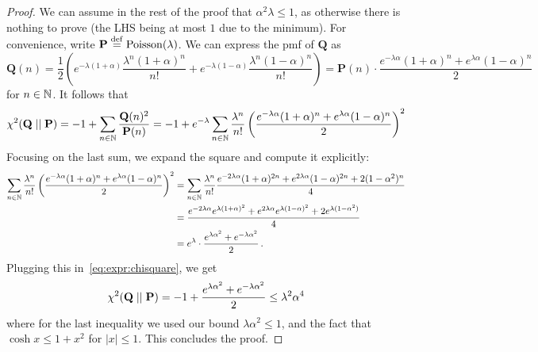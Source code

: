 \documentclass[10pt]{article}
\newcommand{\bigp}{\mathbf{P}}
\newcommand{\bigq}{\mathbf{Q}}
\begin{document}
\begin{proof}
  We can assume in the rest of the proof that $\alpha^2\lambda \leq 1$, as otherwise there is nothing to prove (the LHS being at most $1$ due to the minimum). For convenience, write $\bigp\eqdef \poisson{\lambda}$. We can express the pmf of $\bigq$ as 
  \begin{equation}
      \bigq(n) = \frac{1}{2}\left( e^{-\lambda(1+\alpha)}\frac{\lambda^n(1+\alpha)^n}{n!} + e^{-\lambda(1-\alpha)}\frac{\lambda^n(1-\alpha)^n}{n!} \right)
      = \bigp(n)\cdot\frac{e^{-\lambda\alpha}(1+\alpha)^n + e^{\lambda\alpha}(1-\alpha)^n}{2}
  \end{equation}
  for $n\in \mathbb{N}$. It follows that
  \begin{equation}
    \label{eq:expr:chisquare}
      \chisquare{ \bigq }{ \bigp } = -1 + \sum_{n\in\N} \frac{\bigq(n)^2}{\bigp(n)} = -1 + e^{-\lambda}\sum_{n\in\N} \frac{\lambda^n}{n!}\left( \frac{e^{-\lambda\alpha}(1+\alpha)^n + e^{\lambda\alpha}(1-\alpha)^n}{2}\right)^2
  \end{equation}
  Focusing on the last sum, we expand the square and compute it explicitly:
  \begin{align*}
  \sum_{n\in\mathbb{N}} \frac{\lambda^n}{n!}\left( \frac{e^{-\lambda\alpha}(1+\alpha)^n + e^{\lambda\alpha}(1-\alpha)^n}{2}\right)^2
  &= \sum_{n\in\mathbb{N}} \frac{\lambda^n}{n!} \frac{e^{-2\lambda\alpha}(1+\alpha)^{2n} + e^{2\lambda\alpha}(1-\alpha)^{2n} + 2(1-\alpha^2)^n}{4}\\
  &= \frac{e^{-2\lambda\alpha}e^{\lambda(1+\alpha)^{2}} + e^{2\lambda\alpha}e^{\lambda(1-\alpha)^{2}} + 2e^{\lambda(1-\alpha^2)}}{4}\\
  &= e^{\lambda}\cdot\frac{e^{\lambda\alpha^2} + e^{-\lambda\alpha^2}}{2}\,.
  \end{align*}
  Plugging this in~\eqref{eq:expr:chisquare}, we get
  \begin{equation}
      \chisquare{ \bigq }{ \bigp } = -1 + \frac{e^{\lambda\alpha^2} + e^{-\lambda\alpha^2}}{2} \leq \lambda^2\alpha^4
  \end{equation}
  where for the last inequality we used our bound $\lambda\alpha^2\leq 1$, and the fact that $\cosh x \leq 1+x^2$ for $|x|\leq 1$. This concludes the proof.
\end{proof}

\end{document}
